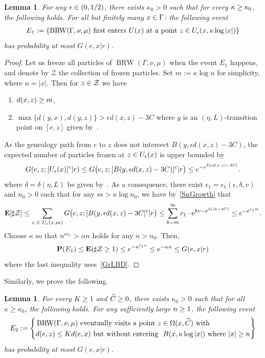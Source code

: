 \documentclass[10pt]{amsart}
\newtheorem{lemm}[theo]{Lemma}\newtheorem{prop}[theo]{Proposition}\newtheorem{coro}[theo]{Corollary}\newtheorem{conj}[theo]{Conjecture}
\theoremstyle{definition}\newtheorem{defi}[theo]{Definition}\newtheorem{rema}[theo]{Remark}\newtheorem{exam}[theo]{Example}\newtheorem{exem}[theo]{Example}\newtheorem{nota}[theo]{Notation}
\newcommand{\rme}{\mathrm{e}}
\newcommand{\bfE}{\mathbf{E}}
\newcommand{\bfP}{\mathbf{P}}
\newcommand{\clZ}{\mathcal{Z}}
\DeclareMathOperator{\BRW}{BRW}
\let\originalleft\left
\let\originalright\right
\renewcommand{\left}{\mathopen{}\mathclose\bgroup\originalleft}
\renewcommand{\right}{\aftergroup\egroup\originalright}
\let\oldin\in
\renewcommand{\in}{\mathchoice{\oldin}{\oldin}{\,\oldin\,}{\,\oldin\,}}
\let\oldge\ge
\renewcommand{\ge}{\mathchoice{\oldge}{\oldge}{\,\oldge\,}{\,\oldge\,}}
\let\oldle\le
\renewcommand{\le}{\mathchoice{\oldle}{\oldle}{\,\oldle\,}{\,\oldle\,}}
\let\oldhat\hat
\renewcommand*{\hat}[1]{\mathchoice{\widehat{#1}}{\widehat{#1}}{\oldhat{#1}}{\oldhat{#1}}}
\begin{document}
\begin{lemm}\label{TraceAvoidTransBall}
For any $\epsilon\in (0,1/2)$, there exists $\kappa_0>0$ such that for every $\kappa\ge \kappa_0$, the following holds. For all but finitely many $x\in \Gamma$: the following event
\begin{align*}
E_1:=\{\BRW(\Gamma,\nu,\mu)~\text{first enters}~U(x)~\text{at a point}~z\in U_{\epsilon}(x,\kappa \log |x|)\}
\end{align*}
has probability at most $G(e,x|r)$.
\end{lemm}

\begin{proof}
Let us freeze all particles of $\BRW(\Gamma,\nu,\mu)$ when the event $E_1$ happens, and denote by $\clZ$ the collection of frozen particles. Set $m:=\kappa \log n$ for simplicity, where $n=|x|$. Then for $z \in \clZ$ we have
\begin{enumerate}
\item $d(x,z)\ge m$,
\item $\max\{d(y,x), d(y,z)\}>\epsilon d(x,z)-3C$ where $y$ is an $(\eta,L)$-transition point on $[e,z]$ given by~\cite[Lemma~6.6]{DWY}.
\end{enumerate}
As the genealogy path from $e$ to $z$ does not intersect $B(y,\epsilon d(x,z)-3C)$, the expected number of particles frozen at $z\in U_\epsilon(x)$ is upper bounded by
\[
G(e,z; [U_\epsilon(x)]^c|r) \le G\bigl(e,z; [B(y,\epsilon d(x,z)-3C)]^c|r\bigr) \le e^{- e^{\delta [\epsilon d(x,z)-3C]}}.
\]
where $\delta=\delta(\eta, L)$ be given by~\cite[Proposition~3.5]{DG21}.
As a consequence, there exist $\epsilon_1=\epsilon_1(\epsilon,\delta,v)$ and $n_0>0$ such that for any $m>\kappa\log n_0$, we have by~\eqref{SnGrowth} that
\[
\bfE[\sharp \clZ]\le \sum_{z\in U_\epsilon(x,m)} G\bigl (e,z; [B(y,\epsilon d(x,z)-3C]^c|r\bigr) \le \sum_{k=m}^{\infty} c_1\cdot \rme^{kv- e^{\delta(\epsilon k-3C)}} \le e^{-e^{\epsilon_1 m}}.
\]
Choose $\kappa$ so that $n^{\kappa \epsilon_1} >\alpha n$ holds for any $n>n_0$. Then,
\[
\bfP(E_1) \le \bfE(\sharp \clZ\ge 1) \le e^{-n^{\epsilon_1\kappa}} \le \rme^{-\alpha n} \le G(e,x|r)
\]
where the last inequality uses~\eqref{GrLBD}.
\end{proof}



Similarly, we prove the following.
\begin{lemm}\label{TraceAvoidTransBall2}
For every $K\geq 1$ and $\hat C\geq 0$, there exists $\kappa_0>0$ such that for all $\kappa\geq \kappa_0$, the following holds. For any sufficiently large $n\ge 1$, the following event
\pagebreak
\[
E_2:=\left\{
\begin{aligned}
&\BRW(\Gamma,\nu,\mu)~\text{eventually visits a point}~z\in \Omega(x,\hat C) \text{ with}\\
& d(e,z)\leq Kd(e,x)\text{ but without entering }~B(x,\kappa \log |x|) \text{ where } |x|\ge n
\end{aligned}
\right\}
\]
has probability at most $G(e,x|r).$
\end{lemm}
\end{document}

